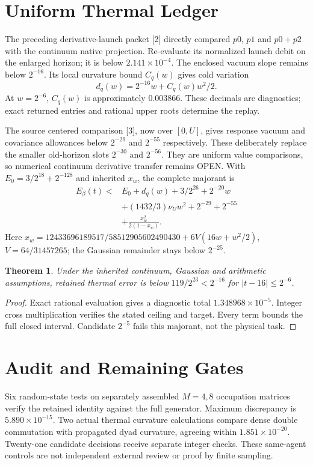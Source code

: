 \documentclass[a4paper,journal]{IEEEtran}
\newtheorem{theorem}{Theorem}
\begin{document}
\section{Uniform Thermal Ledger}
The preceding derivative-launch packet [2] directly compared $p0$, $p1$ and $p0+p2$ with the continuum native projection. Re-evaluate its normalized launch debit on the enlarged horizon; it is below $2.141\times10^{-4}$. The enclosed vacuum slope remains below $2^{-16}$. Its local curvature bound $C_q(w)$ gives cold variation
\begin{equation}
 d_q(w)=2^{-16}w+C_q(w)w^2/2.
\end{equation}
At $w=2^{-6}$, $C_q(w)$ is approximately $0.003866$. These decimals are diagnostics; exact returned entries and rational upper roots determine the replay.

The source centered comparison [3], now over $[0,U]$, gives response vacuum and covariance allowances below $2^{-29}$ and $2^{-55}$ respectively. These deliberately replace the smaller old-horizon slots $2^{-30}$ and $2^{-56}$. They are uniform value comparisons, so numerical continuum derivative transfer remains OPEN. With $E_0=3/2^{18}+2^{-128}$ and inherited $x_w$, the complete majorant is
\begin{align}
 E_\beta(t)<{}&E_0+d_q(w)+3/2^{26}+2^{-20}w\\
 &+(1432/3)\nu_Uw^2+2^{-29}+2^{-55}\\
 &+\frac{x_w^2}{2(1-x_w)}.
\end{align}
Here $x_w=12433696189517/58512905602490430+6V(16w+w^2/2)$, $V=64/31457265$; the Gaussian remainder stays below $2^{-25}$.
\begin{theorem}
Under the inherited continuum, Gaussian and arithmetic assumptions, retained thermal error is below $119/2^{23}<2^{-16}$ for $|t-16|\le2^{-6}$.
\end{theorem}
\begin{proof}
Exact rational evaluation gives a diagnostic total $1.348968\times10^{-5}$. Integer cross multiplication verifies the stated ceiling and target. Every term bounds the full closed interval. Candidate $2^{-5}$ fails this majorant, not the physical task.
\end{proof}
\section{Audit and Remaining Gates}
Six random-state tests on separately assembled $M=4,8$ occupation matrices verify the retained identity against the full generator. Maximum discrepancy is $5.890\times10^{-15}$. Two actual thermal curvature calculations compare dense double commutation with propagated dyad curvature, agreeing within $1.851\times10^{-20}$. Twenty-one candidate decisions receive separate integer checks. These same-agent controls are not independent external review or proof by finite sampling.
\end{document}
